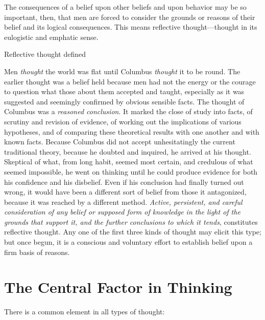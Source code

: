\documentclass[letterpaper]{book}
\begin{document}
The consequences of a belief upon other beliefs and upon behavior may be
so important, then, that men are forced to consider the grounds or
reasons of their belief and its logical consequences. This means
reflective thought---thought in its eulogistic and emphatic sense.

Reflective thought defined

Men \emph{thought} the world was flat until Columbus \emph{thought} it
to be round. The earlier thought was a belief held because men had not
the energy or the courage to question what those about them accepted and
taught, especially as it was suggested and seemingly confirmed by
obvious sensible facts. The thought of Columbus was a \emph{reasoned
conclusion}. It marked the close of study into facts, of scrutiny and
revision of evidence, of working out the implications of various
hypotheses, and
of
comparing these theoretical results with one another and with known
facts. Because Columbus did not accept unhesitatingly the current
traditional theory, because he doubted and inquired, he arrived at his
thought. Skeptical of what, from long habit, seemed most certain, and
credulous of what seemed impossible, he went on thinking until he could
produce evidence for both his confidence and his disbelief. Even if his
conclusion had finally turned out wrong, it would have been a different
sort of belief from those it antagonized, because it was reached by a
different method. \emph{Active, persistent, and careful consideration of
any belief or supposed form of knowledge in the light of the grounds
that support it, and the further conclusions to which it tends},
constitutes reflective thought. Any one of the first three kinds of
thought may elicit this type; but once begun, it is a conscious and
voluntary effort to establish belief upon a firm basis of reasons.

\section{The Central Factor in Thinking}

There is a common element in all types of thought:
\end{document}
